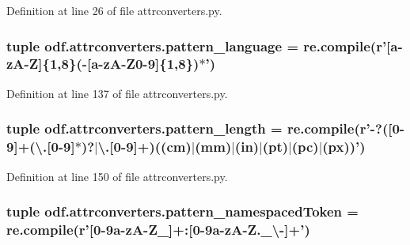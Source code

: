 Definition at line 26 of file attrconverters.\+py.

\hypertarget{namespaceodf_1_1attrconverters_ad9906afdc77dcf5ec8024ddea8af2cd3}{
\subsubsection[{pattern\+\_\+language}]{\setlength{\rightskip}{0pt plus 5cm}tuple odf.\+attrconverters.\+pattern\+\_\+language = re.\+compile(r'\mbox{[}a-\/z\+A-\/Z\mbox{]}\{1,8\}(-\/\mbox{[}a-\/z\+A-\/Z0-\/9\mbox{]}\{1,8\})$\ast$')}}\label{namespaceodf_1_1attrconverters_ad9906afdc77dcf5ec8024ddea8af2cd3}


Definition at line 137 of file attrconverters.\+py.

\hypertarget{namespaceodf_1_1attrconverters_aa90a2e19771f728a7a760efaeb548853}{
\subsubsection[{pattern\+\_\+length}]{\setlength{\rightskip}{0pt plus 5cm}tuple odf.\+attrconverters.\+pattern\+\_\+length = re.\+compile(r'-\/?(\mbox{[}0-\/9\mbox{]}+(\textbackslash{}.\mbox{[}0-\/9\mbox{]}$\ast$)?$\vert$\textbackslash{}.\mbox{[}0-\/9\mbox{]}+)((cm)$\vert$(mm)$\vert$(in)$\vert$(pt)$\vert$(pc)$\vert$(px))')}}\label{namespaceodf_1_1attrconverters_aa90a2e19771f728a7a760efaeb548853}


Definition at line 150 of file attrconverters.\+py.

\hypertarget{namespaceodf_1_1attrconverters_a8b1acec5f51ab504076429de4a44e126}{
\subsubsection[{pattern\+\_\+namespaced\+Token}]{\setlength{\rightskip}{0pt plus 5cm}tuple odf.\+attrconverters.\+pattern\+\_\+namespaced\+Token = re.\+compile(r'\mbox{[}0-\/9a-\/z\+A-\/\+Z\+\_\+\mbox{]}+\+:\mbox{[}0-\/9a-\/z\+A-\/\+Z.\+\_\+\textbackslash{}-\/\mbox{]}+')}}\label{namespaceodf_1_1attrconverters_a8b1acec5f51ab504076429de4a44e126}


